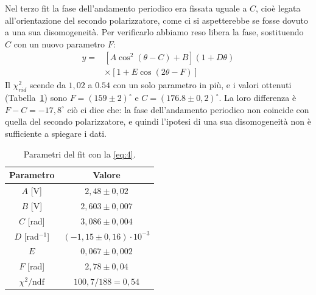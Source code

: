 \documentclass[10pt,twocolumn]{article}
\begin{document}
      Nel terzo fit la fase dell'andamento periodico era fissata uguale a $C$, cioè legata all'orientazione del secondo polarizzatore, come ci si aspetterebbe se fosse dovuto a una sua disomogeneità.
      Per verificarlo abbiamo reso libera la fase, sostituendo $C$ con un nuovo parametro $F$:
      \begin{equation}
        \begin{split}
          y = {}& \left[ A \cos^2(\theta - C) + B \right](1 + D \theta) \\
                & \times \left[ 1 + E \cos(2\theta - F) \right]
        \end{split}
      \label{eq:4}
      \end{equation}
      Il $\chi_{rid}^2$ scende da $1,02$ a $0.54$ con un solo parametro in più, e i valori ottenuti (Tabella~\ref{tab:par4}) sono $F = (159 \pm 2)^\circ$ e $C = (176.8 \pm 0{,}2)^\circ$.
      La loro differenza è $F - C = -17{,}8 ^\circ$ ciò ci dice che: la fase dell'andamento periodico non coincide con quella del secondo polarizzatore,
      e quindi l'ipotesi di una sua disomogeneità non è sufficiente a spiegare i dati. 
      \begin{table}[H]
        \centering
        \small
        \begin{tabular}{cc}
          \toprule
          Parametro & Valore \\
          \midrule
          $A$ [V]               & $2{,}48 \pm 0{,}02$ \\
          $B$ [V]               & $2{,}603 \pm 0{,}007$ \\
          $C$ [rad]             & $3{,}086 \pm 0{,}004$ \\
          $D$ [rad$^{-1}$]      & $(-1{,}15 \pm 0{,}16)\cdot 10^{-3}$ \\
          $E$                   & $0{,}067 \pm 0{,}002$ \\
          $F$ [rad]             & $2{,}78 \pm 0{,}04$ \\
          \midrule
          $\chi^2/\mathrm{ndf}$ & $100{,}7/188 = 0{,}54$ \\
          \bottomrule
        \end{tabular}
        \caption{Parametri del fit con la \ref{eq:4}.}
        \label{tab:par4}
      \end{table}
 
\end{document}

